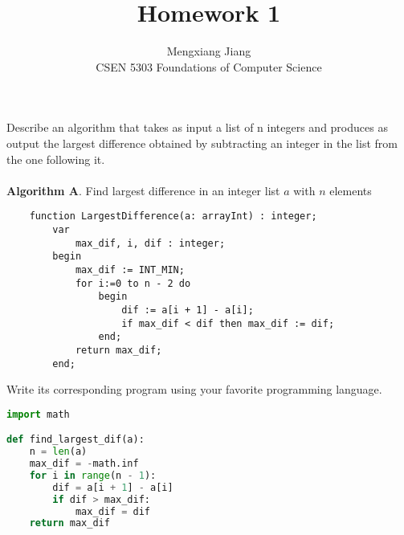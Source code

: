 \documentclass[12pt]{article}
\newenvironment{problem}[2][Problem]{\begin{trivlist}
\item[\hskip \labelsep {\bfseries #1}\hskip \labelsep {\bfseries #2.}]}{\end{trivlist}}
\begin{document}
 
 
\title{Homework 1}%
\author{Mengxiang Jiang\\ %
CSEN 5303 Foundations of Computer Science} %
 
\maketitle
 
\begin{problem}{1} %
Describe an algorithm that takes as input a list of n integers and produces as output
the largest difference obtained by subtracting an integer in the list from the one following it.
\\\\
\textbf{Algorithm A}. Find largest difference in an integer list $a$ with $n$ elements
\begin{verbatim}
    function LargestDifference(a: arrayInt) : integer;
        var
            max_dif, i, dif : integer;
        begin
            max_dif := INT_MIN;
            for i:=0 to n - 2 do
                begin
                    dif := a[i + 1] - a[i];
                    if max_dif < dif then max_dif := dif;
                end;
            return max_dif;
        end;
\end{verbatim}
Write its corresponding program using your favorite programming language.\\

\begin{lstlisting}[language=Python, caption=Largest Difference]
import math

def find_largest_dif(a):
    n = len(a)
    max_dif = -math.inf
    for i in range(n - 1):
        dif = a[i + 1] - a[i]
        if dif > max_dif:
            max_dif = dif
    return max_dif

\end{lstlisting}

\end{problem}
\end{document}
